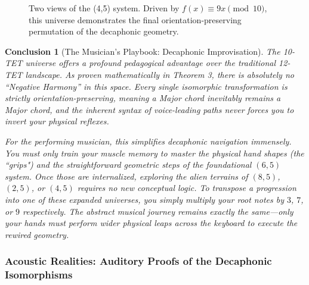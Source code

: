 \documentclass[11pt,letterpaper]{amsart}
\newtheorem{conclusion}{Conclusion}
\begin{document}
\begin{figure}[H]
\begin{minipage}{0.48\textwidth}
        \caption*{Pitch-Space Layout \\ (Geometric Rewiring)}
    \end{minipage}
    \caption{Two views of the (4,5) system. Driven by $f(x) \equiv 9x \pmod{10}$, this universe demonstrates the final orientation-preserving permutation of the decaphonic geometry.}
\end{figure}

\begin{conclusion}[The Musician's Playbook: Decaphonic Improvisation]
The 10-TET universe offers a profound pedagogical advantage over the traditional 12-TET landscape. As proven mathematically in Theorem 3, there is absolutely no ``Negative Harmony'' in this space. Every single isomorphic transformation is strictly orientation-preserving, meaning a Major chord inevitably remains a Major chord, and the inherent syntax of voice-leading paths never forces you to invert your physical reflexes.

For the performing musician, this simplifies decaphonic navigation immensely. You must only train your muscle memory to master the physical hand shapes (the ``grips") and the straightforward geometric steps of the foundational $(6,5)$ system. Once those are internalized, exploring the alien terrains of $(8,5)$, $(2,5)$, or $(4,5)$ requires no new conceptual logic. To transpose a progression into one of these expanded universes, you simply multiply your root notes by $3$, $7$, or $9$ respectively. The abstract musical journey remains exactly the same---only your hands must perform wider physical leaps across the keyboard to execute the rewired geometry.
\end{conclusion}


\subsubsection{Acoustic Realities: Auditory Proofs of the Decaphonic Isomorphisms}
\end{document}
